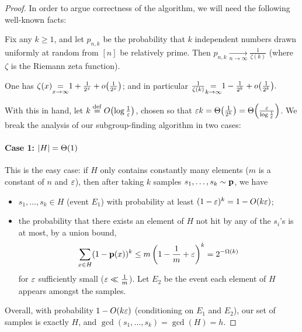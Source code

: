 \begin{proof}
In order to argue correctness of the algorithm, we will need the following well-known facts:

\begin{fact}\label{fact:random:integers:coprime}
Fix any $k\geq 1$, and let $p_{n,k}$ be the probability that $k$ independent numbers drawn uniformly at random from $[n]$ be relatively prime. Then 
$
p_{n,k}\xrightarrow[n\to\infty]{} \frac{1}{\zeta(k)}
$
(where $\zeta$ is the Riemann zeta function).
\end{fact}
\begin{fact} One has
$
\zeta(x) {\displaystyle\operatorname*{=}_{x\to\infty}} 1 + \frac{1}{2^x} + \littleO{\frac{1}{2^x}} 
$;
and in particular
$
\frac{1}{\zeta(k)} {\displaystyle\operatorname*{=}_{k\to\infty}} 1 - \frac{1}{2^k} + \littleO{\frac{1}{2^k}}.
$
\end{fact}

\noindent With this in hand, let $k\eqdef\bigO{\log\frac{1}{\eps}}$,  chosen so that $\eps k = \bigTheta{\frac{1}{2^k}} = \bigTheta{\frac{\eps}{\log\frac{1}{\eps}}}$. We break the analysis of our subgroup-finding algorithm in two cases:
\paragraph{Case 1: $\abs{H}=\bigTheta{1}$} This is the easy case: if $H$ only contains constantly many elements ($m$ is a constant of $n$ and $\varepsilon$), then after taking $k$ samples $s_1,\dots,s_k\sim \mathbf{p}$, we have
\begin{itemize}
  \item $s_1,\dots,s_k\in H$ (event $E_1$) with probability at least $(1-\eps)^k = 1 - \bigO{k\eps}$;  \item the probability that there exists an element of $H$ not hit by any of the $s_i$'s is at most, by a union bound,
    \[
       \sum_{x\in H} (1-\D(x))^k \leq m\left(1-\frac{1}{m}+\eps\right)^k = 2^{-\bigOmega{k}}
    \]
    for $\varepsilon$ sufficiently small ($\varepsilon \ll \frac{1}{m}$). Let $E_2$ be the event each element of $H$ appears amongst the samples.
\end{itemize}
Overall, with probability $1 - \bigO{k\eps}$ (conditioning on $E_1$ and $E_2$), our set of samples is exactly $H$, and $\gcd(s_1,\dots,s_k)=\gcd(H)=h$.

\end{proof}
